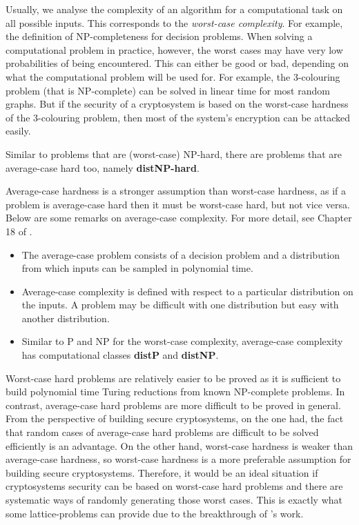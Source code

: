 \documentclass[../main.tex]{subfiles}
\begin{document}
\iffalse 
Usually, we analyse the complexity of an algorithm for a computational task on all possible inputs. This corresponds to the \textit{worst-case complexity}. For example, the definition of NP-completeness for decision problems. When solving a computational problem in practice, however, the worst cases may have very low probabilities of being encountered. This can either be good or bad, depending on what the computational problem will be used for. For example, the 3-colouring problem (that is NP-complete) can be solved in linear time for most random graphs. But if the security of a cryptosystem is based on the worst-case hardness of the 3-colouring problem, then most of the system's encryption can be attacked easily. 

Similar to problems that are (worst-case) NP-hard, there are problems that are average-case hard too, namely \textbf{distNP-hard}. 

Average-case hardness is a stronger assumption than worst-case hardness, as if a problem is average-case hard then it must be worst-case hard, but not vice versa. 
Below are some remarks on average-case complexity. For more detail, see Chapter 18 of \citep{arora2009computational}. 
\begin{itemize}
    \item The average-case problem consists of a decision problem and a distribution from which inputs can be sampled in polynomial time. 
    
    \item Average-case complexity is defined with respect to a particular distribution on the inputs. A problem may be difficult with one distribution but easy with another distribution.  
    
    \item Similar to P and NP for the worst-case complexity, average-case complexity has computational classes \textbf{distP} and \textbf{distNP}. 
\end{itemize}

Worst-case hard problems are relatively easier to be proved as it is sufficient to build polynomial time Turing reductions from known NP-complete problems. In contrast, average-case hard problems are more difficult to be proved in general. From the perspective of building secure cryptosystems, on the one had, the fact that random cases of average-case hard problems are difficult to be solved efficiently is an advantage. On the other hand, worst-case hardness is weaker than average-case hardness, so worst-case hardness is a more preferable assumption for building secure cryptosystems. Therefore, it would be an ideal situation if cryptosystems security can be based on worst-case hard problems and there are systematic ways of randomly generating those worst cases. This is exactly what some lattice-problems can provide due to the breakthrough of \cite{ajtai1996generating}'s work.
\end{document}
